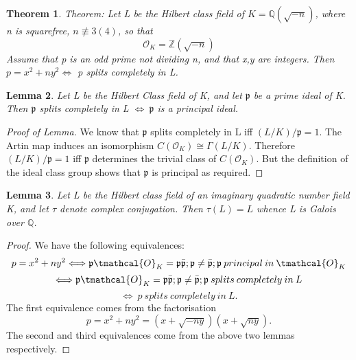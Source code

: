 \documentclass[preprint,12pt,reqno]{elsarticle}
\newtheorem{theorem}{Theorem}
\newtheorem{lemma}[theorem]{Lemma}
\begin{document}
\begin{theorem}
Theorem: Let L be the Hilbert class field of $K=\mathbb{Q}(\sqrt{-n})$, where n is squarefree, $n\not\equiv 3(4)$, so that
\begin{equation}
    \mathcal{O}_K=\mathbb{Z}(\sqrt{-n})
\end{equation}
Assume that p is an odd prime not dividing n, and that x,y are integers. Then 
$p=x^2+ny^2 \Longleftrightarrow$ p splits completely in L.
\end{theorem}
\begin{lemma}
Let L be the Hilbert Class field of K, and let $\mathfrak{p}$ be a prime ideal of K. Then \newline $\mathfrak{p}$ splits completely in L $\Longleftrightarrow\:\mathfrak{p}$ is a principal ideal.
\end{lemma}
\begin{proof}[Proof of Lemma]
We know that $\mathfrak{p}$ splits completely in L iff $(L/K)/\mathfrak{p}=1$. The Artin map induces an isomorphism $C(\mathcal{O}_K)\cong\Gamma(L/K)$. Therefore $(L/K)/\mathfrak{p}=1$ iff $\mathfrak{p}$ determines the trivial class of $C(\mathcal{O}_K)$. But the definition of the ideal class group shows that $\mathfrak{p}$ is principal as required.
\end{proof}
\begin{lemma}
Let L be the Hilbert class field of an imaginary quadratic number field K, and let $\tau$ denote complex conjugation. Then $\tau(L)=L$ whence L is Galois over $\mathbb{Q}$.
\end{lemma}
\begin{proof}
We have the following equivalences:
\begin{equation}
    p=x^2+ny^2\Longleftrightarrow\mathfrak{p}\tmathcal{O}_K=\mathfrak{p}\bar{\mathfrak{p}}; \mathfrak{p}\neq\bar{\mathfrak{p}}; \mathfrak{p}\: principal\:in\: \tmathcal{O}_K
\end{equation}
\begin{equation}
    \Longleftrightarrow\mathfrak{p}\tmathcal{O}_K=\mathfrak{p}\bar{\mathfrak{p}}; \mathfrak{p}\neq\bar{\mathfrak{p}}; \mathfrak{p}\:splits\:completely\:in\:L
\end{equation}
\begin{equation}
    \Longleftrightarrow\:p\:splits\:completely\:in\:L.
\end{equation}
The first equivalence comes from the factorisation 
\begin{equation}
    p=x^2+ny^2=(x+\sqrt{-ny})(x+\sqrt{ny}).
\end{equation}
The second and third equivalences come from the above two lemmas respectively.
\end{proof}
\end{document}
